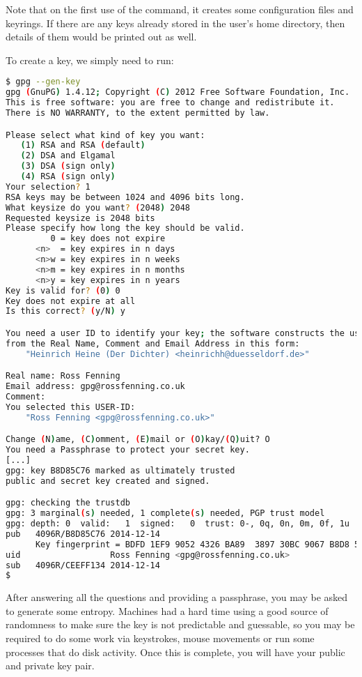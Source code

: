 \documentclass{report}
\begin{document}
Note that on the first use of the command, it creates some configuration files
and keyrings. If there are any keys already stored in the user's home
directory, then details of them would be printed out as well.

To create a key, we simply need to run:

\begin{lstlisting}[language=bash]
$ gpg --gen-key
gpg (GnuPG) 1.4.12; Copyright (C) 2012 Free Software Foundation, Inc.
This is free software: you are free to change and redistribute it.
There is NO WARRANTY, to the extent permitted by law.

Please select what kind of key you want:
   (1) RSA and RSA (default)
   (2) DSA and Elgamal
   (3) DSA (sign only)
   (4) RSA (sign only)
Your selection? 1
RSA keys may be between 1024 and 4096 bits long.
What keysize do you want? (2048) 2048
Requested keysize is 2048 bits
Please specify how long the key should be valid.
         0 = key does not expire
      <n>  = key expires in n days
      <n>w = key expires in n weeks
      <n>m = key expires in n months
      <n>y = key expires in n years
Key is valid for? (0) 0
Key does not expire at all
Is this correct? (y/N) y

You need a user ID to identify your key; the software constructs the user ID
from the Real Name, Comment and Email Address in this form:
    "Heinrich Heine (Der Dichter) <heinrichh@duesseldorf.de>"

Real name: Ross Fenning
Email address: gpg@rossfenning.co.uk
Comment:
You selected this USER-ID:
    "Ross Fenning <gpg@rossfenning.co.uk>"

Change (N)ame, (C)omment, (E)mail or (O)kay/(Q)uit? O
You need a Passphrase to protect your secret key.
[...]
gpg: key B8D85C76 marked as ultimately trusted
public and secret key created and signed.

gpg: checking the trustdb
gpg: 3 marginal(s) needed, 1 complete(s) needed, PGP trust model
gpg: depth: 0  valid:   1  signed:   0  trust: 0-, 0q, 0n, 0m, 0f, 1u
pub   4096R/B8D85C76 2014-12-14
      Key fingerprint = BDFD 1EF9 9052 4326 BA89  3897 30BC 9067 B8D8 5C76
uid                  Ross Fenning <gpg@rossfenning.co.uk>
sub   4096R/CEEFF134 2014-12-14
$
\end{lstlisting}

After answering all the questions and providing a passphrase,
you may be asked to generate some entropy.
Machines had a hard time using a good source of randomness to make sure
the key is not predictable and guessable, so you may be required to do
some work via keystrokes, mouse movements or run some processes that
do disk activity. Once this is complete, you will have your public and
private key pair.
\end{document}

